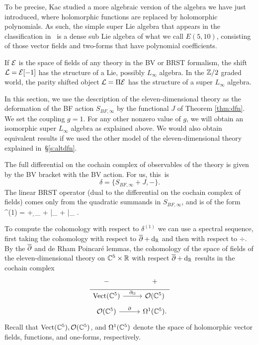 To be precise, Kac studied a more algebraic version of the algebra we have just introduced, where holomorphic functions are replaced by holomorphic polynomials.
As such, the simple super Lie algebra that appears in the classification in~\cite{KacBible} is a dense sub Lie algebra of what we call $E(5,10)$, consisting of those vector fields and two-forms that have polynomial coefficients.

\parsec[]

If $\mathcal E$ is the space of fields of any theory in the BV or BRST formalism, the shift $\mathcal L = \mathcal E[-1]$ has the structure of a Lie, possibly $L_\infty$ algebra. 
In the $\mathbb Z/2$ graded world, the parity shifted object $\mathcal L = \Pi \mathcal E$ has the structure of a super $L_\infty$ algebra. 

In this section, we use the description of the eleven-dimensional theory as the deformation of the BF action $S_{BF,\infty}$ by the functional $J$ of Theorem \ref{thm:dfn}. 
We set the coupling $g = 1$. For any other nonzero value of $g$, we will obtain an isomorphic super $L_\infty$ algebra as explained above.
We would also obtain equivalent  results if we used the other model of the eleven-dimensional theory explained in~\S\ref{s:altdfn}. 

The full differential on the cochain complex of observables of the theory is given by the BV bracket with the BV action. 
For us, this~is 
\[
\delta = \{S_{BF,\infty} + J, -\} .
\]
The linear BRST operator (dual to the differential on the cochain complex of fields) comes only from the quadratic summands in $S_{BF,\infty}$, and is of the form
\beqn\label{eqn:linearBRST}
\delta^{(1)} = \dbar + \d_{\RR} + \div |_{\mu \to \nu} + \del |_{\beta \to \gamma} .
\eeqn

To compute the cohomology with respect to $\delta^{(1)}$ we can use a spectral sequence, first taking the cohomology with respect to $\overline{\partial} + {\rm d}_{\mathbb R}$ and then with respect to $\div$. 
By the $\overline{\partial}$ and de Rham Poincar\'e lemmas, the cohomology of the space of fields of the eleven-dimensional theory on $\mathbb C^5 \times \mathbb R$ with respect $\overline{\partial} + {\rm d}_{\mathbb R}$ results in the cochain complex
\begin{equation}
  \label{eq:lin1} 
  \begin{tikzcd}[row sep = 1 ex]
    - & + \\ \hline
    \Vect(\CC^5) \ar[r, "\div"] & \cO(\CC^5) \\ 
     \cO(\CC^5) \ar[r, "\del"] & \Omega^{1}(\CC^5).
\end{tikzcd}
\end{equation}
Recall that ${\rm Vect}(\mathbb C^5), \mathcal O(\mathbb C^5)$, and $\Omega^1(\mathbb C^5)$ denote the space of holomorphic vector fields, functions, and one-forms, respectively.

